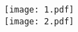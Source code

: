 \documentclass{article}
\begin{document}
\centering

\texttt{[image: 1.pdf]}\\[5cm]
\texttt{[image: 2.pdf]}
\end{document}

